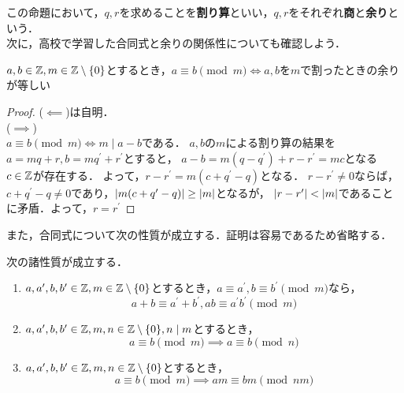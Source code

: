     この命題において，$q,r$を求めることを\textbf{割り算}といい，$q,r$をそれぞれ\textbf{商}と\textbf{余り}という．\\
    次に，高校で学習した合同式と余りの関係性についても確認しよう．

    \begin{prop}
      $a,b \in \mathbb{Z}, m \in \mathbb{Z} \setminus \lbrace0\rbrace$とするとき，$a \equiv b \pmod m \iff a,b$を$m$で割ったときの余りが等しい
    \end{prop}
    \begin{proof}
      ($\impliedby$)は自明．\\
      ($\implies$)\\
      $a \equiv b \pmod m \iff m \mid a-b$である．
      $a,b$の$m$による割り算の結果を$a=mq+r, b=mq^{\prime} + r^{\prime}$とすると，
      $a-b = m(q - q^{\prime})+ r - r^{\prime} = mc$となる$c \in \mathbb{Z}$が存在する．
      よって，$r-r^{\prime} = m(c + q^{\prime} - q)となる．$
      $r - r^{\prime} \neq 0$ならば，$c+q^{\prime} - q \neq 0$であり，$\lvert m(c + q^{\prime} - q)\rvert \geq \lvert m\rvert$となるが，
      $\lvert r-r^{\prime}\rvert < \lvert m\rvert$であることに矛盾．よって，$r = r^{\prime}$ 
    \end{proof}

    また，合同式について次の性質が成立する．証明は容易であるため省略する．
    
    \begin{prop}
      次の諸性質が成立する．
      \begin{enumerate}
        \item $a,a^{\prime}, b, b^{\prime} \in \mathbb{Z}, m \in \mathbb{Z} \setminus \lbrace0\rbrace$とするとき，$a \equiv a^{\prime}, b \equiv b^{\prime} \pmod m$なら，
          \begin{equation}
            a+b \equiv a^{\prime} + b^{\prime}, ab \equiv a^{\prime}b^{\prime} \pmod m \nonumber
          \end{equation}
        \item $a,a^{\prime}, b, b^{\prime} \in \mathbb{Z}, m, n \in \mathbb{Z} \setminus \lbrace0\rbrace, n \mid m$とするとき，
          \begin{equation}
            a \equiv b \pmod m \implies a \equiv b \pmod n \nonumber
          \end{equation}
        \item $a,a^{\prime}, b, b^{\prime} \in \mathbb{Z}, m, n \in \mathbb{Z} \setminus \lbrace0\rbrace$とするとき，
          \begin{equation}
            a \equiv b \pmod m \implies am \equiv bm \pmod {nm} \nonumber
          \end{equation}
      \end{enumerate}
    \end{prop}

